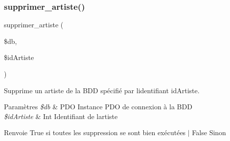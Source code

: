 \subsubsection{\texorpdfstring{supprimer\+\_\+artiste()}{supprimer\_artiste()}}
{\footnotesize\ttfamily supprimer\+\_\+artiste (\begin{DoxyParamCaption}\item[{}]{\$db,  }\item[{}]{\$id\+Artiste }\end{DoxyParamCaption})}



Supprime un artiste de la B\+DD spécifié par l\textquotesingle{}identifiant \textquotesingle{}id\+Artiste\textquotesingle{}. 


\begin{DoxyParams}{Paramètres}
{\em \$db} & P\+DO Instance P\+DO de connexion à la B\+DD \\
\hline
{\em \$id\+Artiste} & Int Identifiant de l\textquotesingle{}artiste \\
\hline
\end{DoxyParams}
\begin{DoxyReturn}{Renvoie}
True si toutes les suppression se sont bien exécutées $\vert$ False Sinon 
\end{DoxyReturn}
